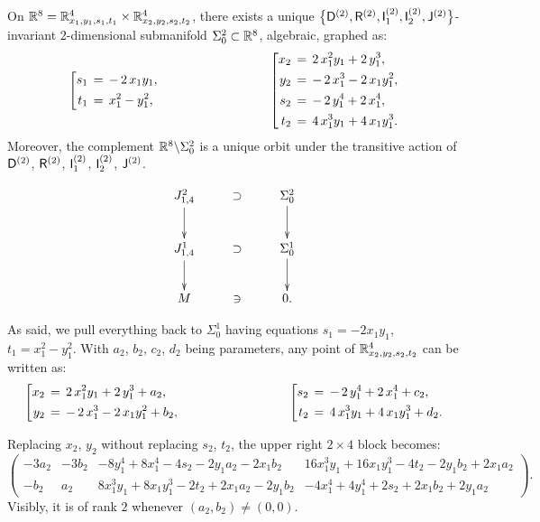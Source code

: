 \documentclass[12pt,twoside,leqno,openany]{amsart}
\begin{document}
\begin{Observation}
\label{Obs-Sigma-0-jets-2}
On $\mathbb{R}^8 = \mathbb{R}_{x_1, y_1, s_1, t_1}^4 \times 
\mathbb{R}_{x_2, y_2, s_2, t_2}^4$, there
exists a unique $\big\{ {\sf D}^{(2)}, {\sf R}^{(2)},
{\sf I}_1^{(2)}, {\sf I}_2^{(2)}, {\sf J}^{(2)} 
\big\}$-invariant
$2$-dimensional submanifold
$\Sigma_0^2 \subset \mathbb{R}^8$, algebraic, graphed as:
\[
\left[
\aligned
s_1
&
\,=\,
-\,2\,x_1y_1,
\\
t_1
&
\,=\,
x_1^2-y_1^2,
\endaligned\right.
\ \ \ \ \ \ \ \ \ \ \ \ \ \ \ \ \ \ \ \ \ \ \ \ \ \
\left[
\aligned
x_2
&
\,=\,
2\,x_1^2y_1
+
2\,y_1^3,
\\
y_2
&
\,=\,
-\,2\,x_1^3
-
2\,x_1y_1^2,
\\
s_2
&
\,=\,
-\,2\,y_1^4+2\,x_1^4,
\\
t_2
&
\,=\,
4\,x_1^3y_1
+
4\,x_1y_1^3.
\endaligned\right.
\]
Moreover, the complement $\mathbb{R}^8 \backslash \Sigma_0^2$ is a unique
orbit under the transitive action of ${\sf D}^{(2)}$, ${\sf R}^{(2)}$,
${\sf I}_1^{(2)}$, ${\sf I}_2^{(2)}$, ${\sf J}^{(2)}$.
\end{Observation}

\[
\xymatrix{
J_{1,4}^2
\ar[d]
&
\supset
&
\Sigma_0^2
\ar[d]
\\
J_{1,4}^1
\ar[d]
&
\supset
&
\Sigma_0^1
\ar[d]
\\
M
&
\ni
&
0.
}
\]

\proof
As said, we pull everything back to $\Sigma_0^1$ having equations
$s_1 = - 2 x_1y_1$, $t_1 = x_1^2 - y_1^2$. 
With $a_2$, $b_2$, $c_2$, $d_2$ being parameters, any point
of $\mathbb{R}_{x_2, y_2, s_2, t_2}^4$ can be written as:
\[
\left[
\aligned
x_2
&
\,=\,
2\,x_1^2y_1
+
2\,y_1^3
+
a_2,
\\
y_2
&
\,=\,
-\,2\,x_1^3
-
2\,x_1y_1^2
+
b_2,
\endaligned\right.
\ \ \ \ \ \ \ \ \ \ \ \ \ \ \ \ \ \ \ \ \ \ \ \ \ \
\left[
\aligned
s_2
&
\,=\,
-\,2\,y_1^4+2\,x_1^4
+
c_2,
\\
t_2
&
\,=\,
4\,x_1^3y_1
+
4\,x_1y_1^3
+
d_2.
\endaligned\right.
\]

Replacing $x_2$, $y_2$ without replacing $s_2$, $t_2$,
the upper right $2 \times 4$ block becomes:
\[
\left(\!
\begin{array}{cccc}
-3a_2 & -3b_2 & -8y_1^4+8x_1^4-4s_2-2y_1a_2-2x_1b_2 & 
16x_1^3y_1+16x_1y_1^3-4t_2-2y_1b_2+2x_1a_2
\\
-b_2 & a_2 & 8x_1^3y_1+8x_1y_1^3-2t_2+2x_1a_2-2y_1b_2 &
-4x_1^4+4y_1^4+2s_2+2x_1b_2+2y_1a_2
\end{array}
\!\right).
\]
Visibly, it is of rank $2$ whenever $(a_2, b_2) \neq (0, 0)$.
\end{document}
